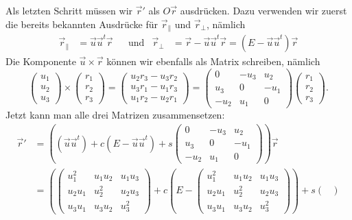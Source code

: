 \begin{diskussion}
Als letzten Schritt müssen wir $\vec r'$ als $O\vec r$ ausdrücken.
Dazu verwenden wir zuerst die bereits bekannten Ausdrücke für $\vec r_{\|}$
und $\vec r_{\perp}$, nämlich
\begin{align*}
\vec r_{\|}
&=
\vec u\vec u^t\vec r
&
&\text{und}&
\vec r_{\perp}
&=
\vec r - \vec u\vec u^t\vec r
=
(E-\vec u\vec u^t)\vec r
\end{align*}
Die Komponente $\vec u\times \vec r$ können wir ebenfalls als Matrix schreiben,
nämlich
\[
\begin{pmatrix}u_1\\u_2\\u_3\end{pmatrix}
\times
\begin{pmatrix}r_1\\r_2\\r_3\end{pmatrix}
=
\begin{pmatrix}
u_2r_3-u_3r_2\\
u_3r_1-u_1r_3\\
u_1r_2-u_2r_1
\end{pmatrix}
=
\begin{pmatrix}
   0&-u_3& u_2\\
 u_3&   0&-u_1\\
-u_2& u_1&   0
\end{pmatrix}
\begin{pmatrix}r_1\\r_2\\r_3\end{pmatrix}.
\]
Jetzt kann man alle drei Matrizen zusammensetzen:
\begin{align*}
\vec r'
&=
\left(
(\vec u\vec u^t) + c(E-\vec u\vec u^t) + 
s
\begin{pmatrix}
   0&-u_3& u_2\\
 u_3&   0&-u_1\\
-u_2& u_1&   0
\end{pmatrix}
\right)
\vec r
\\
&=
\left(
\begin{pmatrix}
u_1^2&u_1u_2&u_1u_3\\
u_2u_1&u_2^2&u_2u_3\\
u_3u_1&u_3u_2&u_3^2
\end{pmatrix}
+c
\left(E-
\begin{pmatrix}
u_1^2&u_1u_2&u_1u_3\\
u_2u_1&u_2^2&u_2u_3\\
u_3u_1&u_3u_2&u_3^2
\end{pmatrix}
\right)
+s
\begin{pmatrix}

\end{pmatrix}
\end{align*}
\end{diskussion}
